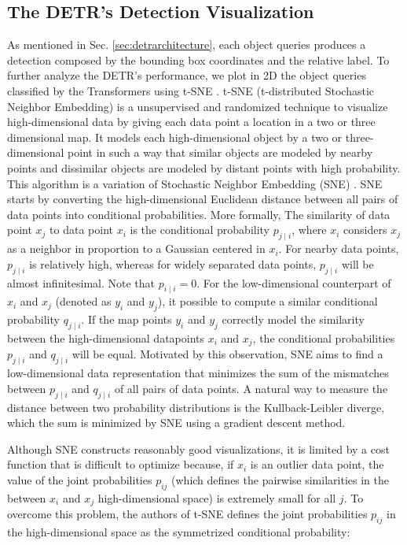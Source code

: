 \subsection{The DETR's Detection Visualization}
As mentioned in Sec. \ref{sec:detrarchitecture}, each object queries produces a detection composed by the bounding box coordinates and the relative label. To further analyze the DETR's performance, we plot in 2D the object queries classified by the Transformers using t-SNE \cite{tsne}. t-SNE (t-distributed Stochastic Neighbor Embedding) is a unsupervised and randomized technique to visualize high-dimensional data by giving each data point a location in a two or three dimensional map. It models each high-dimensional object by a two or three-dimensional point in such a way that similar objects are modeled by nearby points and dissimilar objects are modeled by distant points with high probability. This algorithm is a variation of Stochastic Neighbor Embedding (SNE) \cite{sne}. SNE starts by converting the high-dimensional Euclidean distance between all pairs of data points into conditional probabilities. More formally,  The similarity of data point $x_j$ to data point $x_i$ is the conditional probability $p_{j \mid i}$, where $x_i$ considers $x_j$ as a neighbor in proportion to a Gaussian centered in $x_i$. For nearby data points, $p_{j \mid i}$
is relatively high, whereas for widely separated data points, $p_{j \mid i}$ will be almost infinitesimal. Note that $p_{i \mid i} = 0$. For the low-dimensional counterpart of  $x_i$ and $x_j$ (denoted as $y_i$ and $y_j$), it possible to compute a similar conditional probability  $q_{j \mid i}$.
If the map points $y_i$ and $y_j$ correctly model the similarity between the high-dimensional datapoints $x_i$ and $x_j$, the conditional probabilities $p_{j \mid i}$ and $q_{j \mid i}$ will be equal. Motivated by this observation, SNE aims to find a low-dimensional data representation that minimizes the sum of the mismatches between $p_{j \mid i}$ and $q_{j \mid i}$ of all pairs of data points. A natural way to measure the distance between two probability distributions is the Kullback-Leibler diverge, which the sum is minimized by SNE using a gradient descent method.

Although SNE constructs reasonably good visualizations, it is limited by a cost function that is difficult to optimize because, if $x_i$ is an outlier data point, the value of the joint probabilities $p_{i j}$ (which defines the pairwise similarities in the between $x_i$ and $x_j$ high-dimensional space) is extremely small for all $j$. To overcome this problem, the authors of t-SNE defines the joint probabilities $p_{i j}$ in the high-dimensional space as the symmetrized conditional probability:


